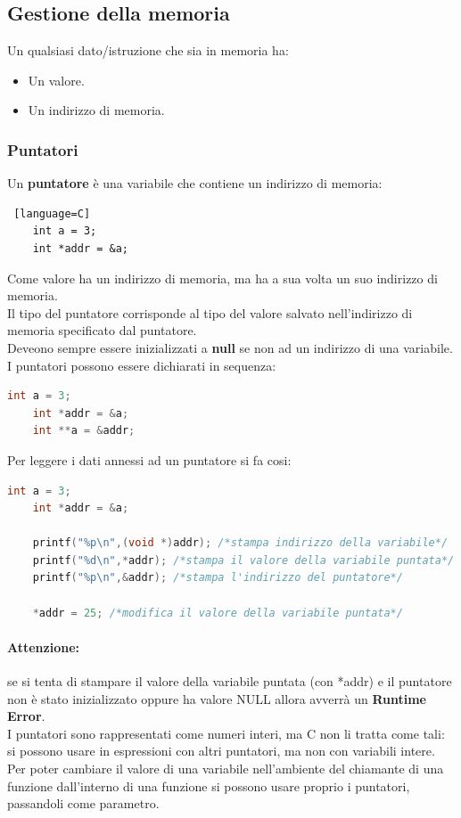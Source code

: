 \documentclass[12pt,a4paper]{article}
\begin{document}
\subsection{Gestione della memoria}
Un qualsiasi dato/istruzione che sia in memoria ha:
\begin{itemize}
    \item Un valore.
    \item Un indirizzo di memoria.
\end{itemize}
\subsubsection{Puntatori}
Un \textbf{puntatore} è una variabile che contiene un indirizzo di memoria:
\begin{lstlisting} [language=C]
    int a = 3;
    int *addr = &a;
\end{lstlisting}
Come valore ha un indirizzo di memoria, ma ha a sua volta un suo indirizzo di memoria.\\
Il tipo del puntatore corrisponde al tipo del valore salvato nell'indirizzo di memoria specificato dal puntatore.\\
Deveono sempre essere inizializzati a \textbf{null} se non ad un indirizzo di una variabile.\\
I puntatori possono essere dichiarati in sequenza:
\begin{lstlisting}[language=C]
    int a = 3;
    int *addr = &a;
    int **a = &addr;
\end{lstlisting}
Per leggere i dati annessi ad un puntatore si fa cosi:
\begin{lstlisting}[language=C]
    int a = 3;
    int *addr = &a;

    printf("%p\n",(void *)addr); /*stampa indirizzo della variabile*/
    printf("%d\n",*addr); /*stampa il valore della variabile puntata*/
    printf("%p\n",&addr); /*stampa l'indirizzo del puntatore*/

    *addr = 25; /*modifica il valore della variabile puntata*/
\end{lstlisting}
\paragraph{Attenzione:} se si tenta di stampare il valore della variabile puntata (con *addr) e il puntatore non è stato inizializzato oppure ha valore NULL allora avverrà un \textbf{Runtime Error}.\\
I puntatori sono rappresentati come numeri interi, ma C non li tratta come tali: si possono usare in espressioni con altri puntatori, ma non con variabili intere.\\
Per poter cambiare il valore di una variabile nell'ambiente del chiamante di una funzione dall'interno di una funzione si possono usare proprio i puntatori, passandoli come parametro.
\end{document}
